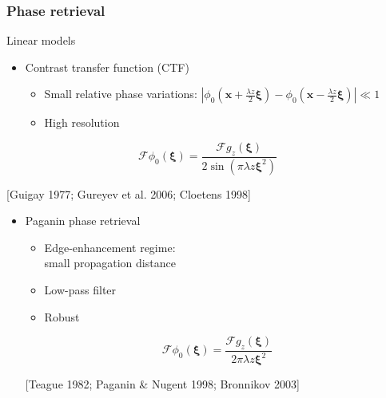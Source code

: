\documentclass{beamer}
\renewcommand{\vec}{\mathbold}
\newcommand{\vecx}{\vec{x}}
\newcommand{\vecxi}{\vec{\xi}}
\newcommand{\abs}[1]{\left| #1 \right|} %
\newcommand{\F}{\mathcal{F}}
\newcommand{\srefr}[1]{\begin{flushright}{\tiny [#1]}\end{flushright}}
\begin{document}
\begin{frame}
  \frametitle{Phase retrieval}
  Linear models
  \vfill
  \begin{itemize}
  \item Contrast transfer function (CTF)
    \begin{itemize}
    \item Small relative phase variations:
      $\abs{\phi_0(\vecx+\tfrac{\lambda z}{2}\vecxi)
        -\phi_0(\vecx-\tfrac{\lambda z}{2}\vecxi)}\ll 1$
    \item High resolution
    \end{itemize}
  \end{itemize}
  \begin{equation*}
    \F\phi_0(\vecxi) = \frac{\F g_z(\vecxi) }{2\sin(\pi\lambda z\vecxi^2)}
  \end{equation*}
  \srefr{Guigay 1977; Gureyev et al. 2006; Cloetens 1998}
  \vfill
  \begin{itemize}
  \item Paganin phase retrieval
    \begin{itemize}
    \item Edge-enhancement regime: \\small propagation distance
    \item Low-pass filter
    \item Robust
    \end{itemize}
    \begin{equation*}
      \F\phi_0(\vecxi) = \frac{\F g_z(\vecxi) }{2\pi\lambda z\vecxi^2}
    \end{equation*}
    \srefr{Teague 1982; Paganin \& Nugent 1998; Bronnikov 2003}
  \end{itemize}
\end{frame}
\end{document}
